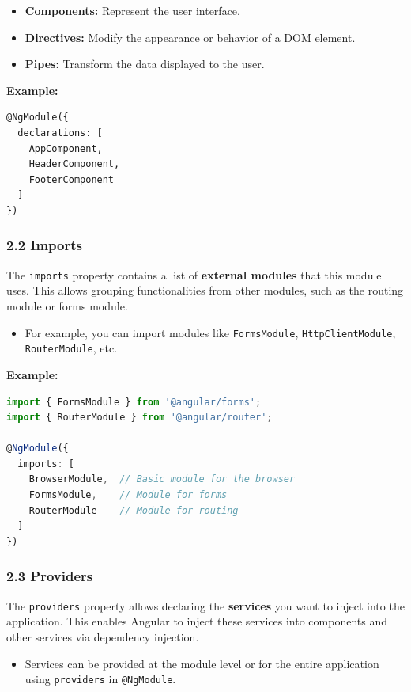 \documentclass{article}
\begin{document}
\begin{itemize}
    \item \textbf{Components:} Represent the user interface.
    \item \textbf{Directives:} Modify the appearance or behavior of a DOM element.
    \item \textbf{Pipes:} Transform the data displayed to the user.
\end{itemize}

\textbf{Example:}  
\begin{verbatim}
@NgModule({
  declarations: [
    AppComponent,
    HeaderComponent,
    FooterComponent
  ]
})
\end{verbatim}

\subsubsection*{2.2 Imports}
The \texttt{imports} property contains a list of \textbf{external modules} that this module uses. This allows grouping functionalities from other modules, such as the routing module or forms module.

\begin{itemize}
    \item For example, you can import modules like \texttt{FormsModule}, \texttt{HttpClientModule}, \texttt{RouterModule}, etc.
\end{itemize}

\textbf{Example:}  
\begin{lstlisting}[language=TypeScript, caption={Using a service in a component}, label={lst:typescript-service-usage}]
import { FormsModule } from '@angular/forms';
import { RouterModule } from '@angular/router';

@NgModule({
  imports: [
    BrowserModule,  // Basic module for the browser
    FormsModule,    // Module for forms
    RouterModule    // Module for routing
  ]
})
\end{lstlisting}

\subsubsection*{2.3 Providers}
The \texttt{providers} property allows declaring the \textbf{services} you want to inject into the application. This enables Angular to inject these services into components and other services via dependency injection.

\begin{itemize}
    \item Services can be provided at the module level or for the entire application using \texttt{providers} in \texttt{@NgModule}.
\end{itemize}
\end{document}
